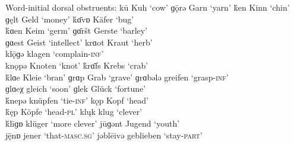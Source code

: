 \ea%
\label{ex:11:45}Word-initial dorsal obstruents:              
\ea\label{ex:11:45a}  kū        \tab [kuː]       \tab Kuh       \tab ‘cow’   
\ex\label{ex:11:45b}  ɡǭrə      \tab [gɔrə]      \tab Garn      \tab ‘yarn’  
\ex\label{ex:11:45c}  \'{k}en   \tab [cen]       \tab Kinn      \tab ‘chin’  
\ex\label{ex:11:45d}  ɡęlt      \tab [ɟɛlt]      \tab Geld      \tab ‘money’ 
\ex\label{ex:11:45e}  \'{k}ɑ̄vɒ  \tab [cɑːvɐ]     \tab Käfer     \tab ‘bug’   \\
     \'{k}ɑen  \tab [cɑen]      \tab Keim      \tab ‘germ’  
\ex\label{ex:11:45f}  ɡɑ̄ršt     \tab [ɟɑːrʃt]    \tab Gerste    \tab ‘barley’    \\
     ɡɑest     \tab [ɟɑest]     \tab Geist     \tab ‘intellect’ 
\ex\label{ex:11:45g}  krɑot     \tab [krɑot]     \tab Kraut     \tab ‘herb’      \\
     klǭɡǝ     \tab [klɔːgǝ]    \tab klagen    \tab ‘complain-\textsc{inf}’ \\
     knǫpǝ     \tab [knɔpǝ]     \tab Knoten    \tab ‘knot’     
\ex\label{ex:11:45h}  \'{k}rɑ̄fs \tab [crɑːfs]    \tab Krebs     \tab ‘crab’     \\
     \'{k}lɑe  \tab [clɑe]      \tab Kleie     \tab ‘bran’     
\ex\label{ex:11:45i}  ɡrɑp      \tab [grɑp]      \tab Grab      \tab ‘grave’    
\ex\label{ex:11:45j}  ɡrɑbələ   \tab [ɟrɑbələ]   \tab greifen   \tab ‘grasp-\textsc{inf}’ \\
     ɡlɑeχ     \tab [ɟlɑeç]     \tab gleich    \tab ‘soon’    
\ex\label{ex:11:45k}  ɡlek      \tab [ɉlek]      \tab Glück     \tab ‘fortune’ \\
     \'{k}nepə \tab [cnepə]     \tab knüpfen   \tab ‘tie{}-\textsc{inf}’ 
\ex\label{ex:11:45l}   kǫp      \tab [kɔp]       \tab Kopf      \tab ‘head’               \\
     \'{k}ęp   \tab [cɛp]       \tab Köpfe     \tab ‘head-\textsc{pl}’              
\ex\label{ex:11:45m}  klųk  \tab [klʊk]      \tab klug      \tab ‘clever’             \\
     \'{k}līɡɒ \tab [cliːɟɐ]    \tab klüger    \tab ‘more clever’     
\ex\label{ex:11:45n}  jūɡənt    \tab [ʝuːgənt]   \tab Jugend    \tab ‘youth’           \\
     j\={ę}nɒ  \tab [ʝɛːnɐ]     \tab jener     \tab ‘that\textsc{{}-masc.sg}’ 
\ex\label{ex:11:45o}  jəblēivə  \tab [ʝəbleːivə] \tab geblieben \tab ‘stay-\textsc{part}’    
\z 
\z 

